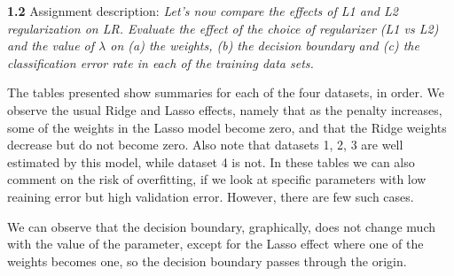 \documentclass[10pt]{article}
\newcommand{\ds}{\displaystyle}
\begin{document}
\textbf{1.2} Assignment description: \emph{Let's now compare the effects of L1 and L2 regularization on LR. Evaluate the effect of the choice of regularizer (L1 vs L2) and the value of $\ds \lambda$ on (a) the weights, (b) the
decision boundary and (c) the classification error rate in each of the training data sets.}

The tables presented show summaries for each of the four datasets, in order. We observe the usual Ridge and Lasso effects, namely that as the penalty increases, some of the weights in the Lasso model become zero, and that the Ridge weights decrease but do not become zero. Also note that datasets 1, 2, 3 are well estimated by this model, while dataset 4 is not. In these tables we can also comment on the risk of overfitting, if we look at specific parameters with low reaining error but high validation error. However, there are few such cases.

We can observe that the decision boundary, graphically, does not change much with the value of the parameter, except for the Lasso effect where one of the weights becomes one, so the decision boundary passes through the origin.
\end{document}
